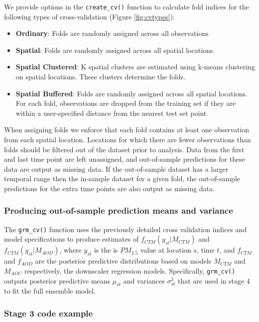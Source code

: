 \documentclass[12pt]{article}
\begin{document}
We provide options in the \texttt{create\_cv()} function to calculate fold indices for the following types of cross-validation (Figure \ref{fig:cvtypes}):

\begin{itemize}
  \item \textbf{Ordinary}: Folds are randomly assigned across all observations
  \item \textbf{Spatial}: Folds are randomly assigned across all spatial locations. 
  \item \textbf{Spatial Clustered}: K spatial clusters are estimated using k-means clustering on spatial locations. These clusters determine the folds. 
  \item \textbf{Spatial Buffered}: Folds are randomly assigned across all spatial locations. For each fold, observations are dropped from the training set if they are within a user-specified distance from the nearest test set point. 
\end{itemize}

When assigning folds we enforce that each fold contains at least one observation from each spatial location.
Locations for which there are fewer observations than folds should be filtered out of the dataset prior to analysis.
Data from the first and last time point are left unassigned, and out-of-sample predictions for these data are output as missing data.
If the out-of-sample dataset has a larger temporal range then the in-sample dataset for a given fold, the out-of-sample predictions for the extra time points are also output as missing data.

\subsubsection*{Producing out-of-sample prediction means and variance}

The \texttt{grm\_cv()} function uses the previously detailed cross validation indices and model specifications to produce estimates of $f_{CTM}(y_{st} | M_{CTM})$ and $f_{CTM}(y_{st} | M_{AOD})$, where $y_{st}$ is the is $PM_{2.5}$ value at location $s$, time $t$, and $f_{CTM}$ and $f_{AOD}$ are the posterior predictive distributions based on models $M_{CTM}$ and $M_{AOC}$ respectively, the downscaler regression models. 
Specifically, \texttt{grm\_cv()} outputs posterior predictive means $\mu_{st}$ and variances $\sigma^2_{st}$ that are used in stage 4 to fit the full ensemble model. 


\subsubsection*{Stage 3 code example}
\end{document}

